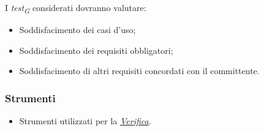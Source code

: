 I \textit{test}\textsubscript{\textit{G}} considerati dovranno valutare: 
\begin{itemize}
    \item 
        Soddisfacimento dei casi d’uso;
    \item 
        Soddisfacimento dei requisiti obbligatori;
    \item 
        Soddisfacimento di altri requisiti concordati con il committente.
\end{itemize}

\subsubsection{Strumenti}
\begin{itemize}
    \item 
        Strumenti utilizzati per la \hyperlink{subsubsec:strumentiVerifica}{\textit{Verifica}}.
\end{itemize}
